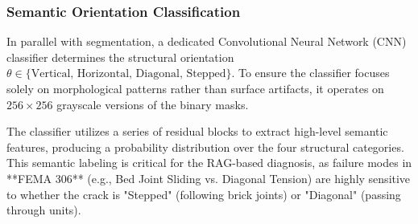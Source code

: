 \subsubsection{Semantic Orientation Classification}
\begin{sloppypar}
In parallel with segmentation, a dedicated Convolutional Neural Network (CNN) classifier determines the structural orientation $\theta \in \{\text{Vertical, Horizontal, Diagonal, Stepped}\}$. To ensure the classifier focuses solely on morphological patterns rather than surface artifacts, it operates on $256 \times 256$ grayscale versions of the binary masks. 
\end{sloppypar}

\begin{sloppypar}
The classifier utilizes a series of residual blocks to extract high-level semantic features, producing a probability distribution over the four structural categories. This semantic labeling is critical for the RAG-based diagnosis, as failure modes in **FEMA 306** (e.g., Bed Joint Sliding vs. Diagonal Tension) are highly sensitive to whether the crack is "Stepped" (following brick joints) or "Diagonal" (passing through units).
\end{sloppypar}
